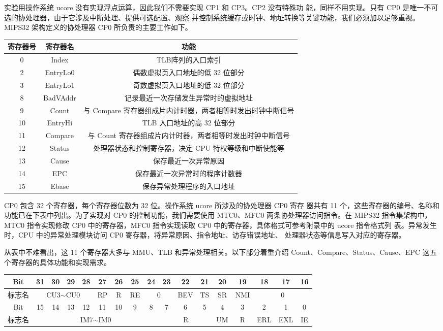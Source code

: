 \documentclass[11pt,utf8]{article}
\begin{document}
实验用操作系统 ucore 没有实现浮点运算，因此我们不需要实现 CP1 和 CP3。CP2 没有特殊功 能，同样不用实现。只有 CP0 是唯一不可选的协处理器，由于它涉及中断处理、提供可选配置、观察 并控制系统缓存或时钟、地址转换等关键功能，我们必须加以足够重视。MIPS32 架构定义的协处理器 CP0 所负责的主要工作如下。

\begin{center}
\begin{tabular}{|c|c|c|}
\hline
\textbf{寄存器号} & \textbf{寄存器名} & \textbf{功能} \\
\hline
0 & Index & TLB阵列的入口索引 \\
2 & EntryLo0 & 偶数虚拟页入口地址的低 32 位部分 \\
3 & EntryLo1 & 奇数虚拟页入口地址的低 32 位部分 \\
8 & BadVAddr & 记录最近一次存储发生异常时的虚拟地址 \\
9 & Count & 与 Compare 寄存器组成片内计时器，两者相等时发出时钟中断信号 \\
10 & EntryHi & TLB 入口地址的高 32 位部分 \\
11 & Compare & 与 Count 寄存器组成片内计时器，两者相等时发出时钟中断信号 \\
12 & Status & 处理器状态和控制寄存器，决定 CPU 特权等级和中断使能等 \\
13 & Cause & 保存最近一次异常原因 \\
14 & EPC & 保存最近一次异常时的程序计数器 \\
15 & Ebase & 保存异常处理程序的入口地址 \\
\hline
\end{tabular}
\end{center}

CP0 包含 32 个寄存器，每个寄存器位数为 32 位。操作系统 ucore 所涉及的协处理器 CP0 寄存 器共有 11 个，这些寄存器的编号、名称和功能已在下表中列出。为了实现对 CP0 的控制功能，我们需要使用 MTC0、MFC0 两条协处理器访问指令。在 MIPS32 指令集架构中，MTC0 指令实现修改 CP0 中的寄存器，MFC0 指令实现读取 CP0 中的寄存器，具体格式可参考附录中的 ucore 指令格式列 表。异常发生时，CPU 中的异常处理模块访问 CP0 寄存器，将异常原因、指令地址、访存错误地址、 处理器状态等信息写入对应的寄存器。

从表中不难看出，这 11 个寄存器大多与 MMU、TLB 和异常处理相关。以下部分着重介绍
Count、Compare、Status、Cause、EPC 这五个寄存器的具体功能和实现需求。
\begin{center}
\begin{tabular}{|c|c|c|c|c|c|c|c|c|c|c|c|c|c|c|c|c|}
\hline
Bit & 31 & 30 & 29 & 28 & 27 & 26 & 25 & 24 & 23 & 22 & 21 & 20 & 19 & 18 & 17 & 16 \\ 
\hline
标志名 & \multicolumn{4}{c|}{CU3$\sim$CU0} & RP & R & RE & \multicolumn{2}{c|}{0} & BEV & TS & SR & NMI & \multicolumn{3}{c|}{0} \\
\hline
Bit & 15 & 14 & 13 & 12 & 11 & 10 & 9 & 8 & 7 & 6 & 5 & 4 & 3 & 2 & 1 & 0 \\
\hline
标志名 & \multicolumn{8}{c|}{IM7$\sim$IM0} & \multicolumn{3}{c|}{R} & UM & R & ERL & EXL & IE \\
\hline
\end{tabular}
\end{center}
\end{document}
